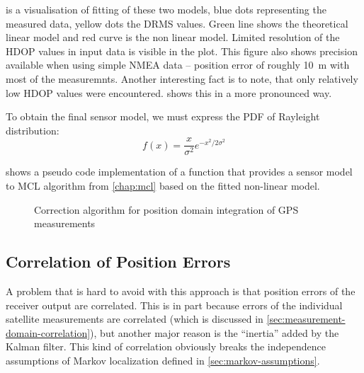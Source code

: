  is a visualisation of fitting of these two models,
blue dots representing the measured data, yellow dots the DRMS values.
Green line shows the theoretical linear model and red curve is the non linear model.
Limited resolution of the HDOP values in input data is visible in the plot.
This figure also shows precision available when using simple NMEA data --
position error of roughly \SI{10}{\meter} with most of the measuremnts.
Another interesting fact is to note, that only relatively low HDOP values were encountered.
 shows this in a more pronounced way.

To obtain the final sensor model, we must express the PDF of Rayleight distribution:
\begin{equation}
    f(x) = \frac{x}{\sigma^2}e^{-x^2/2\sigma^2}
\end{equation}

 shows a pseudo code implementation of a function
that provides a sensor model to MCL algorithm from \cref{chap:mcl} based on the
fitted non-linear model.

\begin{figure}[tp]
\begin{algorithm}[H]


\end{algorithm}
\caption{Correction algorithm for position domain integration of GPS measurements}
\label{algo:gps-position-domain}
\end{figure}

\subsection{Correlation of Position Errors}
\label{sec:position-domain-correlation}
A problem that is hard to avoid with this approach is that position errors of the
receiver output are correlated.
This is in part because errors of the individual satellite measurements are correlated
(which is discussed in \cref{sec:measurement-domain-correlation}), but another major reason
is the \enquote{inertia} added by the Kalman filter.
This kind of correlation obviously breaks the independence assumptions of Markov
localization defined in \cref{sec:markov-assumptions}.

